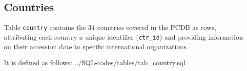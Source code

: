 \subsection{Countries}\label{subsec_tab_country}

Table \texttt{country} contains the 34 countries covered in the PCDB as rows, attributing each country a unique identifier (\texttt{ctr\_id}) and providing information on their accession date to specific international organizations. 

%

It is defined as follows:
%
{../SQL-codes/tables/tab_country.sql}
